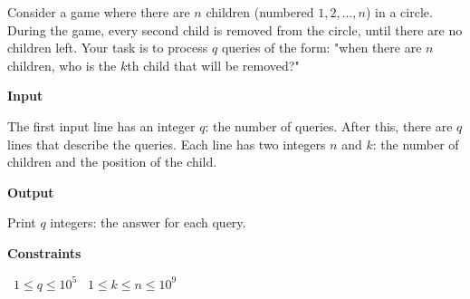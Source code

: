Consider a game where there are $n$ children (numbered $1,2,\dots,n$) in a circle. During the game, every second child is removed from the circle, until there are no children left.
Your task is to process $q$ queries of the form: "when there are $n$ children, who is the $k$th child that will be removed?"

\vspace{0.3cm}\noindent\textbf{Input}

The first input line has an integer $q$: the number of queries.
After this, there are $q$ lines that describe the queries. Each line has two integers $n$ and $k$: the number of children and the position of the child.

\vspace{0.3cm}\noindent\textbf{Output}

Print $q$ integers: the answer for each query.

\vspace{0.3cm}\noindent\textbf{Constraints}

\textbullet\ $1 \le q \le 10^5$
\textbullet\ $1 \le k \le n \le 10^9$